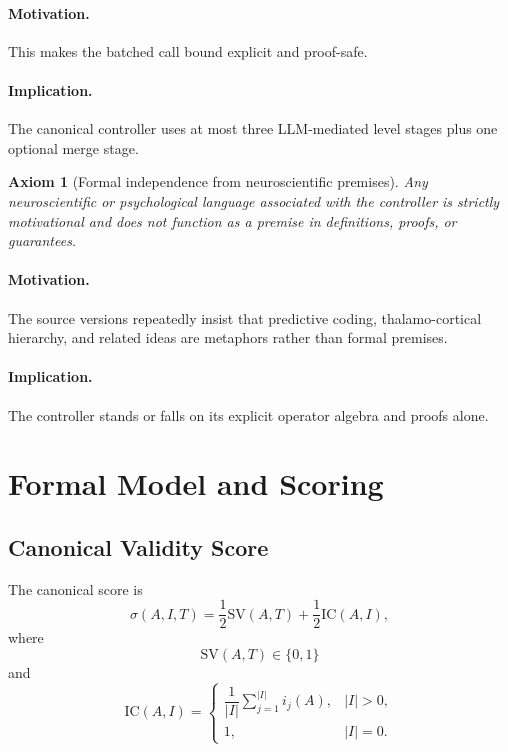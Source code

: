 \documentclass[11pt,a4paper]{article}
\numberwithin{equation}{section}
\newtheorem{axiom}{Axiom}[section]
\theoremstyle{definition}
\newcommand{\SV}{\mathrm{SV}}
\newcommand{\IC}{\mathrm{IC}}
\begin{document}
\paragraph{Motivation.}
This makes the batched call bound explicit and proof-safe.

\paragraph{Implication.}
The canonical controller uses at most three LLM-mediated level stages plus one optional merge stage.

\begin{axiom}[Formal independence from neuroscientific premises]
Any neuroscientific or psychological language associated with the controller is strictly motivational and does not function as a premise in definitions, proofs, or guarantees.
\end{axiom}

\paragraph{Motivation.}
The source versions repeatedly insist that predictive coding, thalamo-cortical hierarchy, and related ideas are metaphors rather than formal premises.

\paragraph{Implication.}
The controller stands or falls on its explicit operator algebra and proofs alone.

\section{Formal Model and Scoring}

\subsection{Canonical Validity Score}

The canonical score is
\begin{equation}
\label{eq:canonical-score}
\sigma(A,I,T)=\frac{1}{2}\SV(A,T)+\frac{1}{2}\IC(A,I),
\end{equation}
where
\[
\SV(A,T)\in\{0,1\}
\]
and
\[
\IC(A,I)=
\begin{cases}
\dfrac{1}{|I|}\sum_{j=1}^{|I|} i_j(A), & |I|>0,\\[1ex]
1, & |I|=0.
\end{cases}
\]
\end{document}
